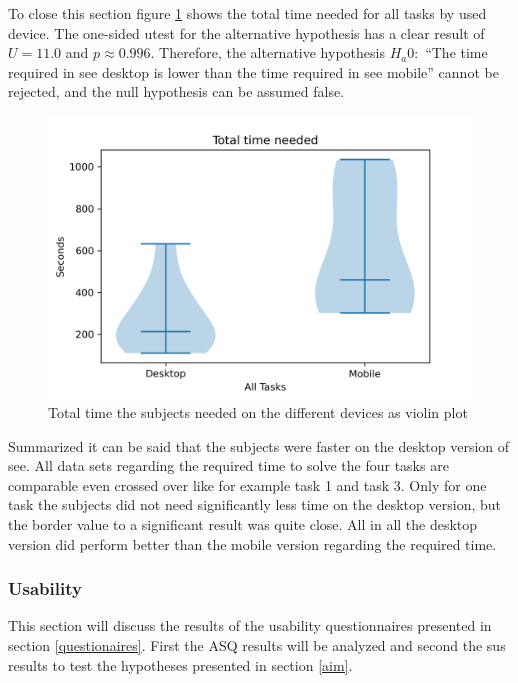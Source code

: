 To close this section figure \ref{fig:device_time_violin} shows the total time needed for all tasks by used device.
The one-sided \gls{utest} for the alternative hypothesis has a clear result of $U=11.0$ and $p \approx 0.996$.
Therefore, the alternative hypothesis $H_a0:$ \enquote{The time required in {\gls{see}} desktop is lower than the time required in \gls{see} mobile} cannot be rejected, and the null hypothesis can be assumed false.

\begin{figure}[htb]
  \centering
  \includegraphics*[width=1\textwidth]{Evaluation/img/device_time_violin.png}
  \caption{Total time the subjects needed on the different devices as violin plot}
  \label{fig:device_time_violin}
\end{figure}

Summarized it can be said that the subjects were faster on the desktop version of \gls{see}.
All data sets regarding the required time to solve the four tasks are comparable even crossed over like for example task 1 and task 3. 
Only for one task the subjects did not need significantly less time on the desktop version, but the border value to a significant result was quite close.
All in all the desktop version did perform better than the mobile version regarding the required time.

\subsubsection{Usability}
\label{sec:usability}
This section will discuss the results of the \gls{usability} questionnaires presented in section \ref{questionaires}.
First the \gls{ASQ} results will be analyzed and second the \gls{sus} results to test the hypotheses presented in section \ref{aim}.
